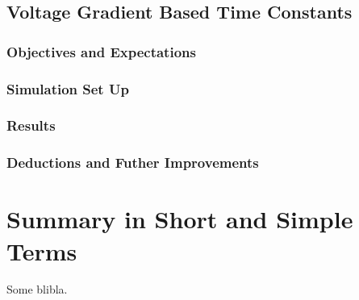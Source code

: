 \subsection{Voltage Gradient Based Time Constants}



\subsubsection{Objectives and Expectations}

\subsubsection{Simulation Set Up}

\subsubsection{Results}

\subsubsection{Deductions and Futher Improvements}




\section{Summary in Short and Simple Terms}

Some blibla.